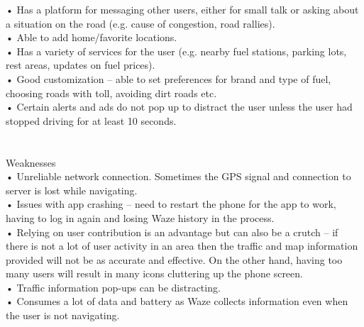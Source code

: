 \documentclass[]{article}
\begin{document}
• Has a platform for messaging other users, either for small talk or asking about a situation on the road (e.g. cause of congestion, road rallies).\\

 • Able to add home/favorite locations.\\
 
 • Has a variety of services for the user (e.g. nearby fuel stations, parking lots, rest areas, updates on fuel prices). \\
 
• Good customization – able to set preferences for brand and type of fuel, choosing roads with toll, avoiding dirt roads etc.\\

 • Certain alerts and ads do not pop up to distract the user unless the user had stopped driving for at least 10 seconds. \\
  \\
  \\
  
Weaknesses \\

• Unreliable network connection. Sometimes the GPS signal and connection to server is lost while navigating. \\

• Issues with app crashing – need to restart the phone for the app to work, having to log in again and losing Waze history in the process. \\

• Relying on user contribution is an advantage but can also be a crutch – if there is not a lot of user activity in an area then the traffic and map information provided will not be as accurate and effective. On the other hand, having too many users will result in many icons cluttering up the phone screen. \\

• Traffic information pop-ups can be distracting. \\

• Consumes a lot of data and battery as Waze collects information even when the user is not navigating.\cite{r2}   \\
 
 

\end{document}

